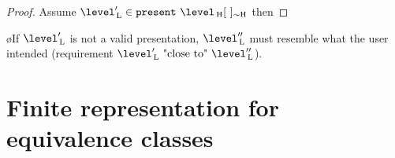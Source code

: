 \begin{proof} Assume $\level'\L \in \present~\level\H\eqcl{}{H}$ then
\end{proof}


%
%
%


\bl
\o If $\level'\L$ is not a valid presentation, $\level''\L$ must resemble what the user intended (requirement $\level'\L~\text{"close to"}~\level''\L$).
\el






%																
%																
%																
\section{Finite representation for equivalence classes}


